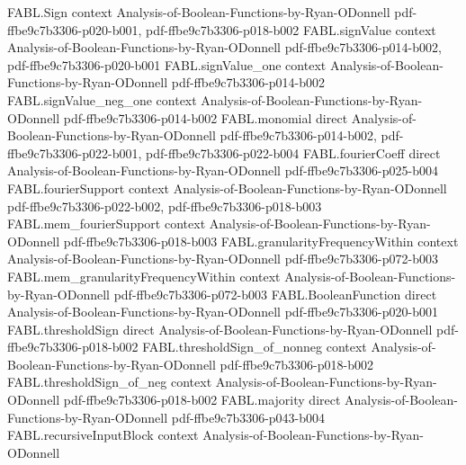 \begin{theorem}
\label{FABL.majority_transitiveSymmetric}
\leanok
{}
\proofstep
  {FABL.Sign}
  {context}
  {Analysis-of-Boolean-Functions-by-Ryan-ODonnell}
  {pdf-ffbe9c7b3306-p020-b001,
    pdf-ffbe9c7b3306-p018-b002}
\proofstep
  {FABL.signValue}
  {context}
  {Analysis-of-Boolean-Functions-by-Ryan-ODonnell}
  {pdf-ffbe9c7b3306-p014-b002,
    pdf-ffbe9c7b3306-p020-b001}
\proofstep
  {FABL.signValue_one}
  {context}
  {Analysis-of-Boolean-Functions-by-Ryan-ODonnell}
  {pdf-ffbe9c7b3306-p014-b002}
\proofstep
  {FABL.signValue_neg_one}
  {context}
  {Analysis-of-Boolean-Functions-by-Ryan-ODonnell}
  {pdf-ffbe9c7b3306-p014-b002}
\proofstep
  {FABL.monomial}
  {direct}
  {Analysis-of-Boolean-Functions-by-Ryan-ODonnell}
  {pdf-ffbe9c7b3306-p014-b002,
    pdf-ffbe9c7b3306-p022-b001,
    pdf-ffbe9c7b3306-p022-b004}
\proofstep
  {FABL.fourierCoeff}
  {direct}
  {Analysis-of-Boolean-Functions-by-Ryan-ODonnell}
  {pdf-ffbe9c7b3306-p025-b004}
\proofstep
  {FABL.fourierSupport}
  {context}
  {Analysis-of-Boolean-Functions-by-Ryan-ODonnell}
  {pdf-ffbe9c7b3306-p022-b002,
    pdf-ffbe9c7b3306-p018-b003}
\proofstep
  {FABL.mem_fourierSupport}
  {context}
  {Analysis-of-Boolean-Functions-by-Ryan-ODonnell}
  {pdf-ffbe9c7b3306-p018-b003}
\proofstep
  {FABL.granularityFrequencyWithin}
  {context}
  {Analysis-of-Boolean-Functions-by-Ryan-ODonnell}
  {pdf-ffbe9c7b3306-p072-b003}
\proofstep
  {FABL.mem_granularityFrequencyWithin}
  {context}
  {Analysis-of-Boolean-Functions-by-Ryan-ODonnell}
  {pdf-ffbe9c7b3306-p072-b003}
\proofstep
  {FABL.BooleanFunction}
  {direct}
  {Analysis-of-Boolean-Functions-by-Ryan-ODonnell}
  {pdf-ffbe9c7b3306-p020-b001}
\proofstep
  {FABL.thresholdSign}
  {direct}
  {Analysis-of-Boolean-Functions-by-Ryan-ODonnell}
  {pdf-ffbe9c7b3306-p018-b002}
\proofstep
  {FABL.thresholdSign_of_nonneg}
  {context}
  {Analysis-of-Boolean-Functions-by-Ryan-ODonnell}
  {pdf-ffbe9c7b3306-p018-b002}
\proofstep
  {FABL.thresholdSign_of_neg}
  {context}
  {Analysis-of-Boolean-Functions-by-Ryan-ODonnell}
  {pdf-ffbe9c7b3306-p018-b002}
\proofstep
  {FABL.majority}
  {direct}
  {Analysis-of-Boolean-Functions-by-Ryan-ODonnell}
  {pdf-ffbe9c7b3306-p043-b004}
\proofstep
  {FABL.recursiveInputBlock}
  {context}
  {Analysis-of-Boolean-Functions-by-Ryan-ODonnell}

\end{theorem}

